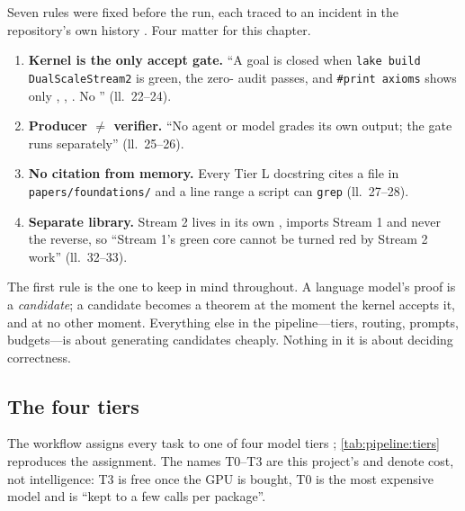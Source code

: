 Seven rules were fixed before the run, each traced to an incident in the repository's own
history . Four matter for this chapter.
\begin{enumerate}[leftmargin=*,itemsep=2pt]
\item \textbf{Kernel is the only accept gate.} ``A goal is closed when \texttt{lake build
  DualScale\allowbreak Stream2} is green, the zero- audit passes, and
  \texttt{\#print axioms} shows only , ,
  . No '' (ll.~22--24).
\item \textbf{Producer $\ne$ verifier.} ``No agent or
  model grades its own output; the gate runs separately'' (ll.~25--26).
\item \textbf{No citation from memory.} Every Tier L docstring cites a file in
  \texttt{papers/foundations/} and a line range a script can \texttt{grep} (ll.~27--28).
\item \textbf{Separate library.} Stream 2 lives in its own , imports Stream
  1 and never the reverse, so ``Stream 1's green core cannot be turned red by Stream 2
  work'' (ll.~32--33).
\end{enumerate}
The first rule is the one to keep in mind throughout. A language model's proof is a
\emph{candidate}; a candidate becomes a theorem at the moment the kernel accepts it, and at
no other moment. Everything else in the pipeline---tiers, routing, prompts, budgets---is
about generating candidates cheaply. Nothing in it is about deciding correctness.

\subsection{The four tiers}\label{sec:pipeline:tiers}

The workflow assigns every task to one of four model tiers ; \cref{tab:pipeline:tiers} reproduces the assignment. The names T0--T3 are this
project's and denote cost, not intelligence: T3 is free once the GPU is bought, T0 is the
most expensive model and is ``kept to a few calls per package''.

